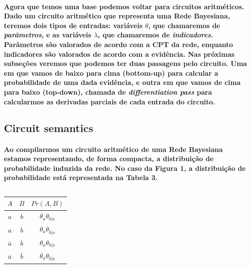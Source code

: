 \documentclass[a4paper,10pt]{article}
\theoremstyle{plain}
\begin{document}
\paragraph{
  Agora que temos uma base podemos voltar para circuitos aritméticos. Dado um circuito aritmético 
que representa uma Rede Bayesiana, teremos dois tipos de entradas: variáveis $\theta$, que 
chamaremos de \textit{parâmetros}, e as variáveis $\lambda$, que chamaremos de 
\textit{indicadores}. Parâmetros são valorados de acordo com a CPT da rede, enquanto indicadores
são valorados de acordo com a evidência. Nas próximas subseções veremos que podemos ter duas
passagens pelo circuito. Uma em que vamos de baixo para cima (bottom-up) para calcular a 
probabilidade de uma dada evidência, e outra em que vamos de cima para baixo (top-down), chamada
de \textit{differentiation pass} para calcularmos as derivadas parciais de cada entrada do 
circuito.
}

\subsection{Circuit semantics}

\paragraph{
  Ao compilarmos um circuito aritmético de uma Rede Bayesiana estamos representando, de forma 
compacta, a distribuição de probabilidade induzida da rede. No caso da Figura 1, a distribuição de
probabilidade está representada na Tabela 3.
}

\setcounter{table}{2}

\begin{table}[h]
\begin{center}
\captionsetup{justification=centering}
\caption{}
\begin{tabular}{c c | c}
$A$ & $B$ & $Pr(A, B)$ \\
\hline
$a$ & $b$ & $\theta_{a}\theta_{b|a}$ \\
$a$ & $\overline{b}$ & $\theta_{a}\theta_{\overline{b}|a}$ \\
$\overline{a}$ & $b$ & $\theta_{\overline{a}}\theta_{b|\overline{a}}$ \\
$\overline{a}$ & $\overline{b}$ & $\theta_{\overline{a}}\theta_{\overline{b}|\overline{a}}$ \\
\end{tabular}
\end{center}
\end{table}
\end{document}
